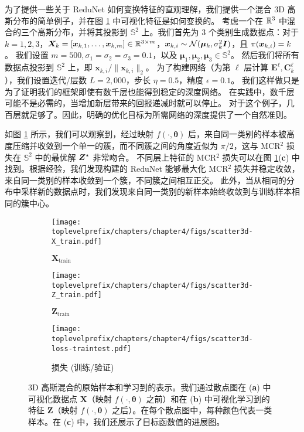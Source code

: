 \documentclass[../../book-main_zh.tex]{subfiles}
\begin{document}
\begin{example}
为了提供一些关于 ReduNet 如何变换特征的直观理解，我们提供一个混合 3D 高斯分布的简单例子，并在图 \ref{fig:redu-3d-gaussian-diagram} 中可视化特征是如何变换的。
考虑一个在 $\mathbb{R}^{3}$ 中混合的三个高斯分布，并将其投影到 $\mathbb{S}^2$ 上。我们首先为 3 个类别生成数据点：对于 $k=1,2,3$，$\bm{X}_{k}=[\bm{x}_{k,1}, \ldots, \bm{x}_{k,m}] \in \mathbb{R}^{3\times m}$，$\bm{x}_{k,i} \sim \mathcal{N}(\bm{\mu}_{k}, \sigma_{k}^{2} \bm{I})$，且 ${\pi}(\bm{x}_{k,i}) = k$。
我们设置 $m=500, \sigma_{1}=\sigma_{2}=\sigma_{3}=0.1$，以及 $\bm{\mu}_{1}, \bm{\mu}_{2}, \bm{\mu}_{3} \in \mathbb{S}^2$。
然后我们将所有数据点投影到 $\mathbb{S}^{2}$ 上，即 $\bm{x}_{k,i}/\|\bm{x}_{k,i}\|_{2}$。
为了构建网络（为第 $\ell$ 层计算 $\bm{E}^{\ell}, \bm{C}^{\ell}_{k}$），我们设置迭代/层数 $L=2,000$，步长 $\eta=0.5$，精度 $\epsilon=0.1$。
我们这样做只是为了证明我们的框架即使有数千层也能得到稳定的深度网络。
在实践中，数千层可能不是必需的，当增加新层带来的回报递减时就可以停止。
对于这个例子，几百层就足够了。因此，明确的优化目标为所需网络的深度提供了一个自然准则。

如图 \ref{fig:redu-3d-gaussian-diagram} 所示，我们可以观察到，经过映射 $f(\cdot, \bm{\theta})$ 后，来自同一类别的样本被高度压缩并收敛到一个单一的簇，而不同簇之间的角度近似为 $\pi/2$，这与 MCR$^2$ 损失在 $\mathbb{S}^2$ 中的最优解 $\bm{Z}^{\star}$ 非常吻合。
不同层上特征的 MCR$^2$ 损失可以在图 \ref{fig:redu-3d-gaussian-diagram}(\textbf{c}) 中找到。根据经验，我们发现构建的 ReduNet 能够最大化 MCR$^2$ 损失并稳定收敛，来自同一类别的样本收敛到一个簇，不同簇之间相互正交。
此外，当从相同的分布中采样新的数据点时，我们发现来自同一类别的新样本始终收敛到与训练样本相同的簇中心。
\begin{figure}[t]
    \begin{subfigure}[t]{0.32\textwidth}
        \centering
        \texttt{[image: \\toplevelprefix/chapters/chapter4/figs/scatter3d-X\_train.pdf]}\vspace{-0.1in}
        \caption{$\bm{X}_{\text{train}}$}
    \end{subfigure}
    \hfill
    \begin{subfigure}[t]{0.32\textwidth}
        \centering
        \texttt{[image: \\toplevelprefix/chapters/chapter4/figs/scatter3d-Z\_train.pdf]}\vspace{-0.1in}
        \caption{$\bm{Z}_{\text{train}}$}
    \end{subfigure}
    \hfill
    \begin{subfigure}[t]{0.32\textwidth}
        \centering
        \texttt{[image: \\toplevelprefix/chapters/chapter4/figs/scatter3d-loss-traintest.pdf]}\vspace{-0.1in}
        \caption{损失 (训练/验证)}
    \end{subfigure}
    \vspace{-0.1in}
    \caption{\small 3D 高斯混合的原始样本和学习到的表示。我们通过散点图在 (\textbf{a}) 中可视化数据点 $\bm{X}$（映射 $f(\cdot, \bm{\theta})$ 之前）和在 (\textbf{b}) 中可视化学习到的特征 $\bm{Z}$（映射 $f(\cdot, \bm{\theta})$ 之后）。在每个散点图中，每种颜色代表一类样本。在 (\textbf{c}) 中，我们还展示了目标函数值的进展图。}
    \label{fig:redu-3d-gaussian-diagram}
\end{figure}


\end{example}
\end{document}
